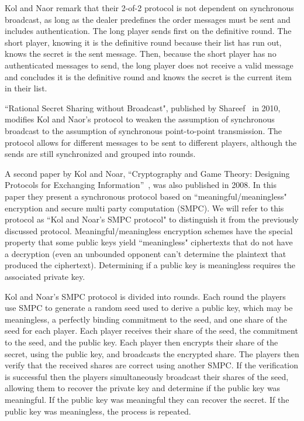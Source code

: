 \documentclass[12pt]{dalcsthesis}
\begin{document}
Kol and Naor remark that their 2-of-2 protocol is not dependent on synchronous broadcast, as long as the dealer predefines the order messages must be sent and includes authentication. The long player sends first on the definitive round. The short player, knowing it is the definitive round because their list has run out, knows the secret is the sent message. Then, because the short player has no authenticated messages to send, the long player does not receive a valid message and concludes it is the definitive round and knows the secret is the current item in their list.

``Rational Secret Sharing without Broadcast", published by Shareef~\cite{Shareef10} in 2010, modifies Kol and Naor's protocol to weaken the assumption of synchronous broadcast to the assumption of synchronous point-to-point transmission. The protocol allows for different messages to be sent to different players, although the sends are still synchronized and grouped into rounds.

A second paper by Kol and Noar, ``Cryptography and Game Theory: Designing Protocols for Exchanging Information''~\cite{kol08-2}, was also published in 2008. In this paper they present a synchronous protocol based on ``meaningful/meaningless" encryption and secure multi party computation (SMPC). We will refer to this protocol as ``Kol and Noar's SMPC protocol" to distinguish it from the previously discussed protocol. Meaningful/meaningless encryption schemes have the special property that some public keys yield ``meaningless" ciphertexts that do not have a decryption (even an unbounded opponent can't determine the plaintext that produced the ciphertext). Determining if a public key is meaningless requires the associated private key. 

Kol and Noar's SMPC protocol is divided into rounds. Each round the players use SMPC to generate a random seed used to derive a public key, which may be meaningless, a perfectly binding commitment to the seed, and one share of the seed for each player. Each player receives their share of the seed, the commitment to the seed, and the public key. Each player then encrypts their share of the secret, using the public key, and broadcasts the encrypted share. The players then verify that the received shares are correct using another SMPC. If the verification is successful then the players simultaneously broadcast their shares of the seed, allowing them to recover the private key and determine if the public key was meaningful. If the public key was meaningful they can recover the secret. If the public key was meaningless, the process is repeated.
\end{document}
